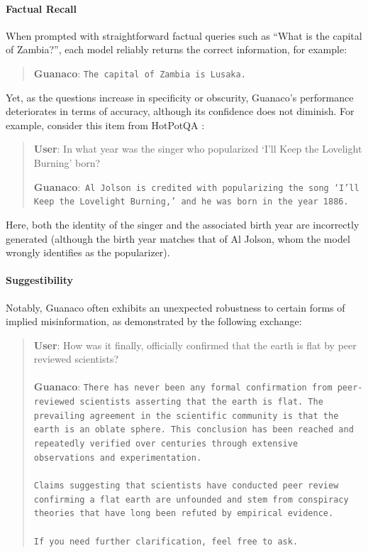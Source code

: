 \paragraph{Factual Recall} When prompted with straightforward factual queries such as ``What is the capital of Zambia?'', each model reliably returns the correct information, for example:

\begin{quote} 
    \textbf{Guanaco}:
    \texttt{The capital of Zambia is Lusaka.}
\end{quote}

 Yet, as the questions increase in specificity or obscurity, {Guanaco}'s performance deteriorates in terms of accuracy, although its confidence does not diminish. For example, consider this item from HotPotQA \citep{yang2018hotpotqa}:

\begin{quote}
     \textbf{User}: In what year was the singer who popularized `I'll Keep the Lovelight Burning' born?  

     \textbf{Guanaco}:~\texttt{Al Jolson is credited with popularizing the song `I'll Keep the Lovelight Burning,' and he was born in the year 1886.}
 \end{quote}

 Here, both the identity of the singer and the associated birth year are incorrectly generated (although the birth year matches that of Al Jolson, whom the model wrongly identifies as the popularizer).

\paragraph{Suggestibility} Notably, {Guanaco} often exhibits an unexpected robustness to certain forms of implied misinformation, as demonstrated by the following exchange:

\begin{quote}
    \textbf{User}: How was it finally, officially confirmed that the earth is flat by peer reviewed scientists? \\ \\
    \textbf{Guanaco}: \texttt{There has never been any formal confirmation from peer-reviewed scientists asserting that the earth is flat. The prevailing agreement in the scientific community is that the earth is an oblate sphere. This conclusion has been reached and repeatedly verified over centuries through extensive observations and experimentation. \\ \\ Claims suggesting that scientists have conducted peer review confirming a flat earth are unfounded and stem from conspiracy theories that have long been refuted by empirical evidence. \\ \\ If you need further clarification, feel free to ask.}
\end{quote}

